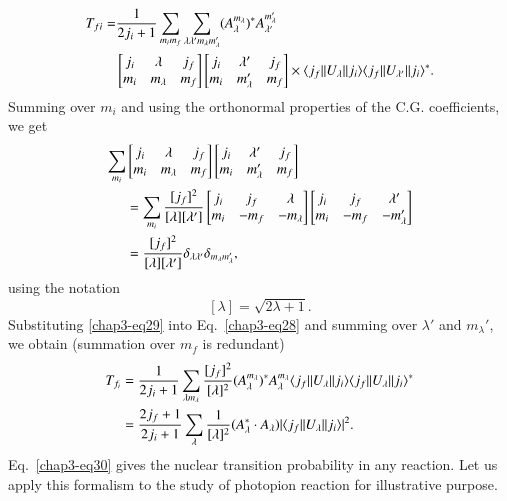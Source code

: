 \begin{align}
  T_{fi}  = & \frac{1}{2j_i+1} \sum_{m_i m_f} \sum_{\lambda \lambda' m_\lambda m_\lambda'} (A_\lambda^{m_\lambda})^\ast A_{\lambda'}^{m_\lambda'}
  \notag \\
 &  \begin{bmatrix} j_i & \lambda & j_f \\ m_i & m_\lambda & m_f\end{bmatrix}
    \begin{bmatrix} j_i & \lambda' & j_f \\ m_i & m_\lambda' & m_f\end{bmatrix}
      \times \langle j_f || U_\lambda || j_i \rangle \langle j_f || U_{\lambda'} || j_i \rangle^\ast. \label{chap3-eq28}
\end{align}
Summing over $m_i$ and using the orthonormal properties of the C.G. coefficients, we get
\begin{align}
  \sum_{m_i} &
  \begin{bmatrix} j_i & \lambda & j_f\\ m_i & m_\lambda & m_f  \end{bmatrix}
  \begin{bmatrix} j_i & \lambda' & j_f \\ m_i & m_\lambda' & m_f\end{bmatrix} \notag \\
    & = \sum_{m_i} \frac{[j_f]^2}{[\lambda][\lambda']}
      \begin{bmatrix} j_i &  j_f  & \lambda \\ m_i &  -m_f & -m_\lambda\end{bmatrix}
      \begin{bmatrix} j_i &  j_f  & \lambda' \\ m_i &  -m_f & -m_\lambda'\end{bmatrix} \notag \\
    & = \frac{[j_f]^2}{[\lambda][\lambda']} \delta_{\lambda \lambda'} \delta_{m_\lambda m_\lambda'}, \label{chap3-eq29}    
\end{align}
using the notation
$$
[\lambda] = \sqrt{2 \lambda +1}.
$$
Substituting \eqref{chap3-eq29} into Eq.\ \eqref{chap3-eq28} and summing over $\lambda'$ and $m_\lambda'$, we obtain (summation over $m_f$ is redundant)
\begin{align}
  T_{f_i} & = \frac{1}{2j_i +1} \sum_{\lambda m_\lambda} \frac{[j_f]^2}{[\lambda]^2} (A_\lambda^{m_\lambda})^\ast A_\lambda^{m_\lambda} \langle j_f || U_\lambda || j_i \rangle \langle j_f || U_\lambda || j_i \rangle^\ast \notag \\
  & = \frac{2j_f+1}{2j_i+1} \sum_{\lambda} \frac{1}{[\lambda]^2} (A_\lambda^\ast \cdot A_\lambda)| \langle j_f || U_\lambda || j_i \rangle |^2. \label{chap3-eq30}
\end{align}
Eq.\ \eqref{chap3-eq30} gives the nuclear transition probability in any reaction. Let us apply this formalism to the study of photopion reaction for illustrative purpose.

